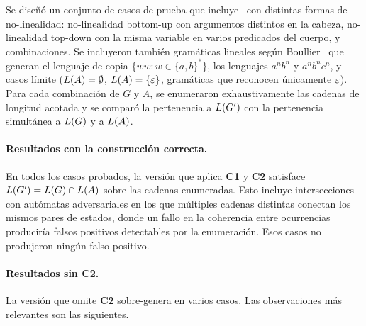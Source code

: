 Se diseñó un conjunto de casos de prueba que incluye \PRCG\ con distintas formas de no-linealidad: no-linealidad bottom-up con argumentos distintos en la cabeza, no-linealidad top-down con la misma variable en varios predicados del cuerpo, y combinaciones. Se incluyeron también gramáticas lineales según Boullier~\cite{REF} que generan el lenguaje de copia $\{ww : w \in \{a, b\}^{*}\}$, los lenguajes $a^n b^n$ y $a^n b^n c^n$, y casos límite ($L(A) = \emptyset$, $L(A) = \{\varepsilon\}$, gramáticas que reconocen únicamente $\varepsilon$). Para cada combinación de $G$ y $A$, se enumeraron exhaustivamente las cadenas de longitud acotada y se comparó la pertenencia a $L(G')$ con la pertenencia simultánea a $L(G)$ y a $L(A)$.

\paragraph{Resultados con la construcción correcta.}

En todos los casos probados, la versión que aplica \textbf{C1} y \textbf{C2} satisface $L(G') = L(G) \cap L(A)$ sobre las cadenas enumeradas. Esto incluye intersecciones con autómatas adversariales en los que múltiples cadenas distintas conectan los mismos pares de estados, donde un fallo en la coherencia entre ocurrencias produciría falsos positivos detectables por la enumeración. Esos casos no produjeron ningún falso positivo.

\paragraph{Resultados sin \textbf{C2}.}

La versión que omite \textbf{C2} sobre-genera en varios casos. Las observaciones más relevantes son las siguientes.

